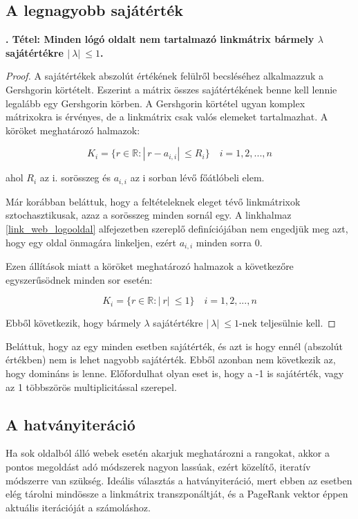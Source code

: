 \documentclass[12pt,a4paper]{article}
\newcounter{tszam}
\newenvironment{tetel}[1]
{{\medskip}\noindent \stepcounter{tszam}
{\bfseries{\thetszam. Tétel: #1\\[1ex]}}}{\bigskip }
\begin{document}
\subsection{A legnagyobb sajátérték}\label{legnagyobb_sajatertek}

\begin{tetel}{Minden lógó oldalt nem tartalmazó linkmátrix bármely $\lambda$ sajátértékre $ |\ \lambda |\ \leq 1$.}
\end{tetel}
\vspace{-1cm}
\begin{proof}
	A sajátértékek abszolút értékének felülről becsléséhez alkalmazzuk a Gershgorin körtételt. Eszerint a mátrix összes sajátértékének benne kell lennie legalább egy Gershgorin körben. A Gershgorin körtétel ugyan komplex mátrixokra is érvényes, de a linkmátrix csak valós elemeket tartalmazhat. A köröket meghatározó halmazok: 
	
	\[ K_i = \{ r \in \mathbb{R}: |\ r - a_{i,i} |\ \leq R_i \} \quad i = 1,2,...,n \]
	
	ahol $R_i$ az i. sorösszeg és $a_{i,i}$ az i sorban lévő főátlóbeli elem.
	
	Már korábban beláttuk, hogy a feltételeknek eleget tévő linkmátrixok sztochasztikusak, azaz a sorösszeg minden sornál egy. A linkhalmaz \ref{link_web_logooldal} alfejezetben szereplő definíciójában nem engedjük meg azt, hogy egy oldal önmagára linkeljen, ezért $a_{i,i}$ minden sorra 0.
	
	Ezen állítások miatt a köröket meghatározó halmazok a következőre egyszerűsödnek minden sor esetén:
	
	\[ K_i = \{ r \in \mathbb{R}: |\ r |\ \leq 1 \} \quad i = 1,2,...,n \]
	
	Ebből következik, hogy bármely $\lambda$ sajátértékre $ |\ \lambda |\ \leq 1$-nek teljesülnie kell.
\end{proof}

Beláttuk, hogy az egy minden esetben sajátérték, és azt is hogy ennél (abszolút értékben) nem is lehet nagyobb sajátérték. Ebből azonban nem következik az, hogy domináns is lenne. Előfordulhat olyan eset is, hogy a -1 is sajátérték, vagy az 1 többszörös multiplicitással szerepel.

\subsection{A hatványiteráció}

Ha sok oldalból álló webek esetén akarjuk meghatározni a rangokat, akkor a pontos megoldást adó módszerek nagyon lassúak, ezért közelítő, iteratív módszerre van szükség. Ideális választás a hatványiteráció, mert ebben az esetben elég tárolni mindössze a linkmátrix transzponáltját, és a PageRank vektor éppen aktuális iterációját a számoláshoz.
\end{document}
